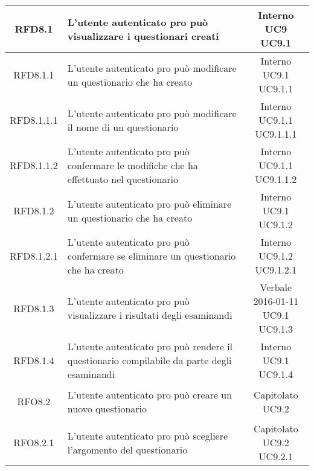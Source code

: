 \begin{longtable}{|c|>{\centering}m{7cm}|c|}
			 \hypertarget{{RFD8.1}}{{RFD8.1}} & L’utente autenticato pro può visualizzare i questionari creati & \makecell{Interno\\ UC9 \\UC9.1 } \\ \hline
			 \hypertarget{{RFD8.1.1}}{{RFD8.1.1}} & L’utente autenticato pro può modificare un questionario che ha creato & \makecell{Interno\\ UC9.1 \\UC9.1.1 } \\ \hline
			 \hypertarget{{RFD8.1.1.1}}{{RFD8.1.1.1}} & L’utente autenticato pro può modificare il nome di un questionario & \makecell{Interno\\ UC9.1.1 \\UC9.1.1.1 } \\ \hline
			 \hypertarget{{RFD8.1.1.2}}{{RFD8.1.1.2}} & L’utente autenticato pro può confermare le modifiche che ha effettuato nel questionario & \makecell{Interno\\ UC9.1.1 \\UC9.1.1.2 } \\ \hline
			 \hypertarget{{RFD8.1.2}}{{RFD8.1.2}} & L’utente autenticato pro può eliminare un questionario che ha creato & \makecell{Interno\\ UC9.1 \\UC9.1.2 } \\ \hline
			 \hypertarget{{RFD8.1.2.1}}{{RFD8.1.2.1}} & L’utente autenticato pro può confermare se eliminare un questionario che ha creato & \makecell{Interno\\ UC9.1.2 \\UC9.1.2.1 } \\ \hline
			 \hypertarget{{RFD8.1.3}}{{RFD8.1.3}} & L’utente autenticato pro può visualizzare i risultati degli esaminandi  & \makecell{Verbale 2016-01-11\\ UC9.1 \\UC9.1.3 } \\ \hline
			 \hypertarget{{RFD8.1.4}}{{RFD8.1.4}} & L’utente autenticato pro può rendere il questionario compilabile da parte degli esaminandi & \makecell{Interno\\ UC9.1 \\UC9.1.4 } \\ \hline
			 \hypertarget{{RFO8.2}}{{RFO8.2}} & L’utente autenticato pro può creare un nuovo questionario & \makecell{Capitolato\\ UC9.2 } \\ \hline
			 \hypertarget{{RFO8.2.1}}{{RFO8.2.1}} & L’utente autenticato pro può scegliere l’argomento del questionario & \makecell{Capitolato\\ UC9.2 \\UC9.2.1 } \\ \hline

\end{longtable}
